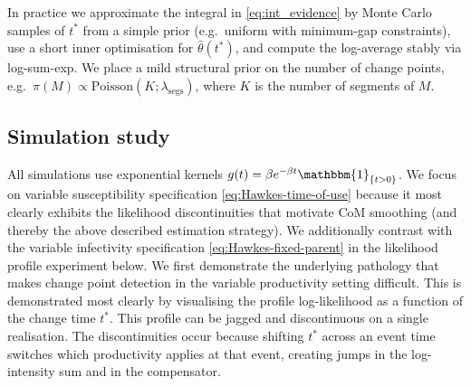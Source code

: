 \documentclass{article}
\theoremstyle{plain}
\theoremstyle{definition}
\newcommand{\1}{\mathbf{1}}
\begin{document}
In practice we approximate the integral in \eqref{eq:int_evidence} by Monte Carlo samples of $t^\ast$ from a simple prior
(e.g.\ uniform with minimum-gap constraints), use a short inner optimisation for $\widehat\theta(t^\ast)$, and compute the
log-average stably via log-sum-exp. We place a mild structural prior on the number of change points, e.g.\ $\pi(M)\propto \mathrm{Poisson}(K;\lambda_{\mathrm{segs}})$, where $K$ is the number of segments of $M$. %

\subsection{Simulation study}
\label{sec:sim}

All simulations use exponential kernels $g(t)=\beta e^{-\beta t}\mathbbm{1}_{\{t>0\}}$.
We focus on variable susceptibility specification \eqref{eq:Hawkes-time-of-use} because it most clearly exhibits the
likelihood discontinuities that motivate CoM smoothing (and thereby the above described estimation strategy). We additionally contrast with the variable infectivity specification \eqref{eq:Hawkes-fixed-parent} in the likelihood profile experiment below. We first demonstrate the underlying pathology that makes change point detection in the variable productivity setting difficult. This is demonstrated most clearly by visualising the profile log-likelihood as a function of the change time $t^\ast$. This profile can be jagged and discontinuous on a single realisation. The discontinuities occur because shifting $t^\ast$ across an event time switches which productivity applies at that event, creating jumps in the log-intensity sum and in the compensator.
\end{document}
